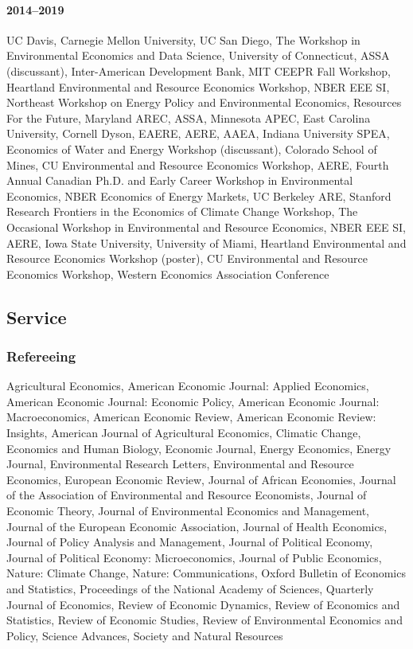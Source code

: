 \documentclass[12pt]{res} %
\begin{document}
\begin{resume}
\paragraph{2014--2019} UC Davis, Carnegie Mellon University, UC San Diego, The Workshop in Environmental Economics and Data Science, University of Connecticut, ASSA (discussant), Inter-American Development Bank, MIT CEEPR Fall Workshop, Heartland Environmental and Resource Economics Workshop, NBER EEE SI, Northeast Workshop on Energy Policy and Environmental Economics, Resources For the Future, Maryland AREC, ASSA, Minnesota APEC, East Carolina University, Cornell Dyson, EAERE, AERE, AAEA, Indiana University SPEA, Economics of Water and Energy Workshop (discussant), Colorado School of Mines, CU Environmental and Resource Economics Workshop, AERE, Fourth Annual Canadian Ph.D. and Early Career Workshop in Environmental Economics, NBER Economics of Energy Markets, UC Berkeley ARE, Stanford Research Frontiers in the Economics of Climate Change Workshop, The Occasional Workshop in Environmental and Resource Economics, NBER EEE SI, AERE, Iowa State University, University of Miami, Heartland Environmental and Resource Economics Workshop (poster), CU Environmental and Resource Economics Workshop, Western Economics Association Conference

\vspace{-.2in}

\subsection{Service}\vspace{-.2in}
\subsubsection{Refereeing}\vspace{-.2in}
	Agricultural Economics,
	American Economic Journal: Applied Economics,
	American Economic Journal: Economic Policy,
	American Economic Journal: Macroeconomics,
	American Economic Review,
	American Economic Review: Insights,
	American Journal of Agricultural Economics,
	Climatic Change,
	Economics and Human Biology,
	Economic Journal,
	Energy Economics,
	Energy Journal,
	Environmental Research Letters,
	Environmental and Resource Economics,
	European Economic Review,
	Journal of African Economies,
	Journal of the Association of Environmental and Resource Economists,
	Journal of Economic Theory,
	Journal of Environmental Economics and Management,
	Journal of the European Economic Association,
	Journal of Health Economics,
	Journal of Policy Analysis and Management,
	Journal of Political Economy,
	Journal of Political Economy: Microeconomics,
	Journal of Public Economics,
	Nature: Climate Change,
	Nature: Communications,
	Oxford Bulletin of Economics and Statistics,
	Proceedings of the National Academy of Sciences,
	Quarterly Journal of Economics,
	Review of Economic Dynamics,
	Review of Economics and Statistics,
	Review of Economic Studies,
	Review of Environmental Economics and Policy,
	Science Advances,
	Society and Natural Resources


\end{resume}
\end{document}
